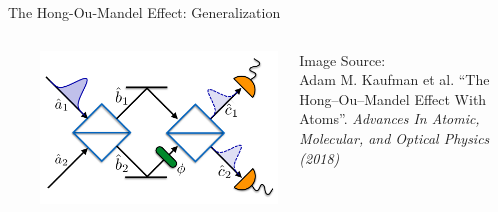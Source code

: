 \begin{frame}[t]{The Hong-Ou-Mandel Effect: Generalization}
\begin{columns}
\begin{itemize}
\begin{align*}
	\end{align*}
\end{itemize}
%
%
	\includegraphics[width=\linewidth]{./gfx/HOM-Phaseshift}
	\begin{minipage}{\linewidth}
		\tiny
		Image Source:\\
		Adam M. Kaufman et al. \enquote{The Hong–Ou–Mandel Effect With Atoms}.
		\emph{Advances In Atomic, Molecular, and Optical Physics (2018)}
	\end{minipage}
\end{columns}
%
\end{frame}


